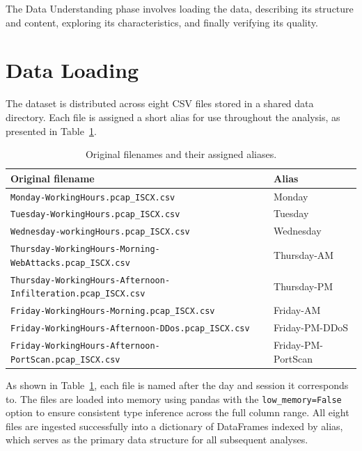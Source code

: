 \documentclass[12pt,a4paper]{article}
\begin{document}
The Data Understanding phase involves loading the data, describing its structure and
content, exploring its characteristics, and finally verifying its quality.

\section{Data Loading}

The dataset is distributed across eight CSV files stored in a shared data directory.
Each file is assigned a short alias for use throughout the analysis, as presented in
Table~\ref{tab:file_aliases}.

\begin{table}[H]
    \centering
    \caption{Original filenames and their assigned aliases.}
    \label{tab:file_aliases}
    \begin{tabular}{|l|l|}
        \hline
        \textbf{Original filename}                                            & \textbf{Alias}     \\
        \hline
        \texttt{Monday-WorkingHours.pcap\_ISCX.csv}                           & Monday             \\
        \hline
        \texttt{Tuesday-WorkingHours.pcap\_ISCX.csv}                          & Tuesday            \\
        \hline
        \texttt{Wednesday-workingHours.pcap\_ISCX.csv}                        & Wednesday          \\
        \hline
        \texttt{Thursday-WorkingHours-Morning-WebAttacks.pcap\_ISCX.csv}      & Thursday-AM        \\
        \hline
        \texttt{Thursday-WorkingHours-Afternoon-Infilteration.pcap\_ISCX.csv} & Thursday-PM        \\
        \hline
        \texttt{Friday-WorkingHours-Morning.pcap\_ISCX.csv}                   & Friday-AM          \\
        \hline
        \texttt{Friday-WorkingHours-Afternoon-DDos.pcap\_ISCX.csv}            & Friday-PM-DDoS     \\
        \hline
        \texttt{Friday-WorkingHours-Afternoon-PortScan.pcap\_ISCX.csv}        & Friday-PM-PortScan \\
        \hline
    \end{tabular}
\end{table}

As shown in Table~\ref{tab:file_aliases}, each file is named after the day and
session it corresponds to. The files are loaded into memory using pandas with the
\texttt{low\_memory=False} option to ensure consistent type inference across the full
column range. All eight files are ingested successfully into a dictionary of DataFrames
indexed by alias, which serves as the primary data structure for all subsequent analyses.
\end{document}
